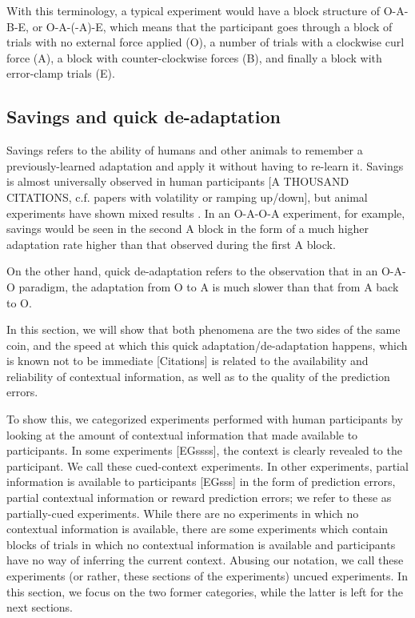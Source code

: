 \documentclass[a4paper,doc,floatsintext,natbib]{apa6}
\begin{document}
With this terminology, a typical experiment \cite[e.g.][]{Ethier_Spontaneous_2008} would have a block structure of O-A-B-E, or O-A-(-A)-E, which means that the participant goes through a block of trials with no external force applied (O), a number of trials with a clockwise curl force (A), a block with counter-clockwise forces (B), and finally a block with error-clamp trials (E).

\subsection{Savings and quick de-adaptation}
Savings refers to the ability of humans and other animals to remember a previously-learned adaptation and apply it without having to re-learn it. Savings is almost universally observed in human participants [A THOUSAND CITATIONS, c.f. papers with volatility or ramping up/down], but animal experiments have shown mixed results \citep[e.g.][]{Kojima_Memory_2004}. In an O-A-O-A experiment, for example, savings would be seen in the second A block in the form of a much higher adaptation rate higher than that observed during the first A block.

On the other hand, quick de-adaptation refers to the observation that in an O-A-O paradigm, the adaptation from O to A is much slower than that from A back to O.

In this section, we will show that both phenomena are the two sides of the same coin, and the speed at which this quick adaptation/de-adaptation happens, which is known not to be immediate [Citations] is related to the availability and reliability of contextual information, as well as to the quality of the prediction errors.

To show this, we categorized experiments performed with human participants by looking at the amount of contextual information that made available to participants. In some experiments [EGssss], the context is clearly revealed to the participant. We call these cued-context experiments. In other experiments, partial information is available to participants [EGsss] in the form of prediction errors, partial contextual information or reward prediction errors; we refer to these as partially-cued experiments. While there are no experiments in which no contextual information is available, there are some experiments which contain blocks of trials in which no contextual information is available and participants have no way of inferring the current context. Abusing our notation, we call these experiments (or rather, these sections of the experiments) uncued experiments. In this section, we focus on the two former categories, while the latter is left for the next sections.
\end{document}
